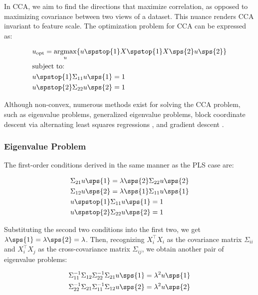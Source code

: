 In CCA, we aim to find the directions that maximize correlation, as opposed to maximizing covariance between two views of a dataset.
This nuance renders CCA invariant to feature scale. The optimization problem for CCA can be expressed as:

\begin{align}
     & u_{\text{opt}}=\underset{u}{\mathrm{argmax}}\{ u\spstop{1}X\spstop{1}X\sps{2}u\sps{2} \} \\
     & \text{subject to:} \notag \\
     & u\spstop{1}\Sigma_{11}u\sps{1}=1 \notag \\
     & u\spstop{2}\Sigma_{22}u\sps{2}=1 \notag
\end{align}

Although non-convex, numerous methods exist for solving the CCA problem, such as eigenvalue problems, generalized eigenvalue problems, block coordinate descent via alternating least squares regressions \cite{golub1995canonical,sun2008least} , and gradient descent \cite{via2007learning}.

\subsubsection{Eigenvalue Problem}

The first-order conditions derived in the same manner as the PLS case are:

\begin{align}\label{CCA:FOCs}
     & \Sigma_{21}u\sps{1}=\lambda\sps{2} \Sigma_{22}u\sps{2} \\
     & \Sigma_{12}u\sps{2}=\lambda\sps{1} \Sigma_{11}u\sps{1} \\
     & u\spstop{1}\Sigma_{11}u\sps{1}=1 \\
     & u\spstop{2}\Sigma_{22}u\sps{2}=1
\end{align}

Substituting the second two conditions into the first two, we get \(\lambda\sps{1}=\lambda\sps{2}=\lambda\). Then, recognizing \(X_i^{\top}X_i\) as the covariance matrix \(\Sigma_{ii}\) and \(X_i^{\top}X_j\) as the cross-covariance matrix \(\Sigma_{ij}\), we obtain another pair of eigenvalue problems:

\begin{align}
     & \Sigma_{11}^{-1}\Sigma_{12}\Sigma_{22}^{-1}\Sigma_{21}u\sps{1}=\lambda^2u\sps{1} \notag \\
     & \Sigma_{22}^{-1}\Sigma_{21}\Sigma_{11}^{-1}\Sigma_{12}u\sps{2}=\lambda^2u\sps{2} \notag
\end{align}

